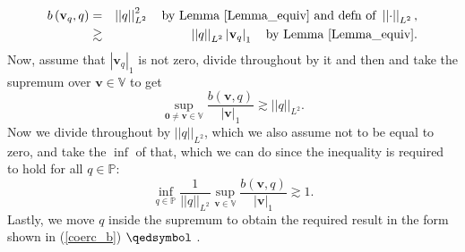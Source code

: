 \documentclass[12pt,a4paper]{article}
\theoremstyle{definition}
\begin{document}
\begin{eqnarray}
b\left(\textbf{v}_q,q\right) &=& \left|\left|q\right|\right|_{L^2}^2 \quad\text{by Lemma \ref{Lemma_equiv}  and defn of } \nonumber \left|\left|\cdot\right|\right|_{L^2},\\
&\gtrsim& \left|\left|q\right|\right|_{L^2} \left|\textbf{v}_q\right|_1\quad \text{by Lemma \ref{Lemma_equiv}}.\nonumber
\end{eqnarray}
Now, assume that $\left|\textbf{v}_q\right|_1$ is not zero, divide throughout by it and then and take the supremum over $\textbf{v}\in \mathbb{V}$ to get
\begin{equation}
\sup_{\textbf{0}\neq\textbf{v}\in \mathbb{V}}\frac{b\left(\textbf{v},q\right)}{\left|\textbf{v}\right|_1} \gtrsim \left|\left|q\right|\right|_{L^2}.\nonumber
\end{equation}
Now we divide throughout by $\left|\left|q\right|\right|_{L^2}$, which we also assume not to be equal to zero, and take the $\inf$ of that, which we can do since the inequality is required to hold for all $q\in \mathbb{P}$:
\begin{equation}
\inf_{q\in \mathbb{P}}\frac{1}{\left|\left|q\right|\right|_{L^2}}\sup_{\textbf{v}\in \mathbb{V}}\frac{b\left(\textbf{v},q\right)}{\left|\textbf{v}\right|_1} \gtrsim 1 \nonumber.
\end{equation}
Lastly, we move $q$  inside the supremum to obtain the required result in the form shown in (\ref{coerc_b}) $\qedsymbol$ .  
\end{document}
